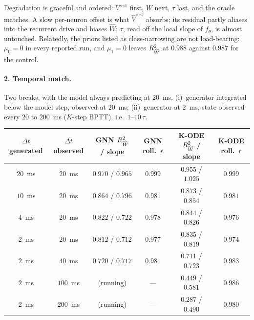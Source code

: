 Degradation is graceful and ordered: $V^{\mathrm{rest}}$ first, $W$ next, $\tau$
last, and the oracle matches. A slow per-neuron offset is what $\widehat
V^{\mathrm{rest}}$ absorbs; its residual partly aliases into the recurrent drive
and biases $\widehat W$; $\tau$, read off the local slope of $f_\theta$, is almost
untouched. Relatedly, the priors listed as class-narrowing are not
load-bearing: $\mu_0=0$ in every reported run, and $\mu_1=0$ leaves $R^2_{\widehat W}$ at
$0.988$ against $0.987$ for the control.

\paragraph{2. Temporal match.}
Two breaks, with the model always
predicting at $20$~ms. (i)~generator integrated below the model step, observed at
$20$~ms; (ii)~generator at $2$~ms, state observed every $20$ to $200$~ms
($K$-step BPTT), i.e.\ $1$--$10\,\tau$.


\begin{center}
{\footnotesize
\begin{tabular}{cccccc}
\toprule
$\Delta t$ generated & $\Delta t$ observed & GNN $R^2_{\widehat W}$ / slope & GNN roll.\ $r$ & K-ODE $R^2_{\widehat W}$ / slope & K-ODE roll.\ $r$ \\
\midrule
$20$~ms & $20$~ms  & $0.970$ / $0.965$ & $0.999$ & $0.955$ / $1.025$ & $0.999$ \\
$10$~ms & $20$~ms  & $0.864$ / $0.796$ & $0.981$ & $0.873$ / $0.854$ & $0.981$ \\
$4$~ms  & $20$~ms  & $0.822$ / $0.722$ & $0.978$ & $0.844$ / $0.826$ & $0.976$ \\
$2$~ms  & $20$~ms  & $0.812$ / $0.712$ & $0.977$ & $0.835$ / $0.819$ & $0.974$ \\
\midrule
$2$~ms  & $40$~ms  & $0.720$ / $0.717$ & $0.981$ & $0.711$ / $0.723$ & $0.983$ \\
$2$~ms  & $100$~ms & (running)         & ---     & $0.449$ / $0.581$ & $0.986$ \\
$2$~ms  & $200$~ms & (running)         & ---     & $0.287$ / $0.490$ & $0.980$ \\
\bottomrule
\end{tabular}}
\end{center}

